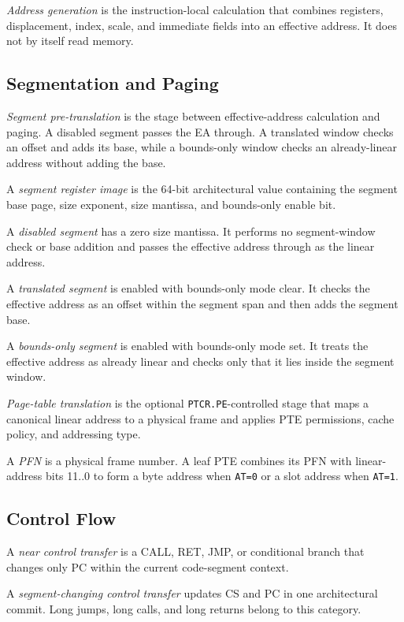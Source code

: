 \emph{Address generation} is the instruction-local calculation that combines registers, displacement, index,
scale, and immediate fields into an effective address. It does not by itself read memory.

\subsection{Segmentation and Paging}

\emph{Segment pre-translation} is the stage between effective-address calculation and paging. A disabled segment
passes the EA through. A translated window checks an offset and adds its base, while a bounds-only window checks an
already-linear address without adding the base.

A \emph{segment register image} is the 64-bit architectural value containing the segment base page, size exponent,
size mantissa, and bounds-only enable bit.

A \emph{disabled segment} has a zero size mantissa. It performs no segment-window check or base addition and passes
the effective address through as the linear address.

A \emph{translated segment} is enabled with bounds-only mode clear. It checks the effective address as an offset
within the segment span and then adds the segment base.

A \emph{bounds-only segment} is enabled with bounds-only mode set. It treats the effective address as already linear
and checks only that it lies inside the segment window.

\emph{Page-table translation} is the optional \texttt{PTCR.PE}-controlled stage that maps a canonical linear
address to a physical frame and applies PTE permissions, cache policy, and addressing type.

A \emph{PFN} is a physical frame number. A leaf PTE combines its PFN with linear-address bits 11..0 to form a byte
address when \texttt{AT=0} or a slot address when \texttt{AT=1}.

\subsection{Control Flow}\label{section:control-flow-terminology}

A \emph{near control transfer} is a CALL, RET, JMP, or conditional branch that changes only PC within the current
code-segment context.

A \emph{segment-changing control transfer} updates CS and PC in one architectural commit. Long jumps, long calls,
and long returns belong to this category.

